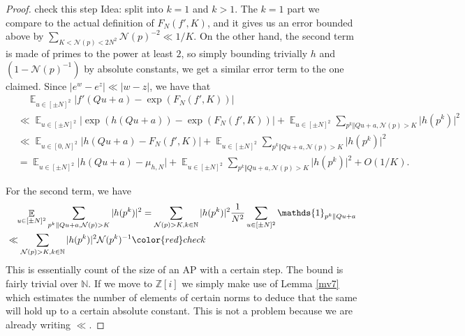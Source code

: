 \documentclass[11pt]{amsart}
\theoremstyle{definition}
\DeclareMathOperator*{\E}{\mathbb{E}}
\newcommand{\N}{{\mathbb N}}
\newcommand{\NN}{{\mathcal N}}
\newcommand{\Z}{{\mathbb Z}}
\begin{document}
\begin{proof}
 {\color{red} check this step}
 {\color{blue} Idea: split into $k=1$ and $k >1$. The $k=1$ part we compare to the actual definition of $F_N(f',K)$, and it gives us an error bounded above by $\sum_{K<\NN(p)<2N^2} \NN(p)^{-2}\ll 1/K$. On the other hand, the second term is made of primes to the power at least $2$, so simply bounding trivially $h$ and $(1-\NN(p)^{-1})$ by absolute constants, we get a similar error term to the one claimed.}
Since $\vert e^{w}-e^{z}\vert\ll \vert w-z\vert$, we have that
\begin{equation}
    \begin{split}
        &\quad\E_{u\in[\pm N]^{2}}\vert f'(Qu+a)-\exp(F_{N}(f',K))\vert
        \\&\ll \E_{u\in[\pm N]^{2}}\vert \exp(h(Qu+a))-\exp(F_{N}(f',K))\vert+\E_{u\in[\pm N]^{2}}\sum_{p^{k}\Vert Qu+a, \NN(p)>K}\vert h(p^{k})\vert^{2}
        \\&\ll \E_{u\in[0,N]^{2}}\vert h(Qu+a)-F_{N}(f',K)\vert+\E_{u\in[\pm N]^{2}}\sum_{p^{k}\Vert Qu+a, \NN(p)>K}\vert h(p^{k})\vert^{2}
        \\&=\E_{u\in[\pm N]^{2}}\vert h(Qu+a)-\mu_{h,N}\vert+\E_{u\in[\pm N]^{2}}\sum_{p^{k}\Vert Qu+a, \NN(p)>K}\vert h(p^{k})\vert^{2}+O(1/K).
    \end{split}
\end{equation}

For the second term, we have
\begin{equation}
    \begin{split}
        &\quad \E_{u\in[\pm N]^{2}}\sum_{p^{k}\Vert Qu+a, \NN(p)>K}\vert h(p^{k})\vert^{2}
        =\sum_{\NN(p)>K, k\in\N}\vert h(p^{k})\vert^{2}\frac{1}{N^{2}}\sum_{u\in [\pm N]^{2}}\mathds{1}_{p^{k}\Vert Qu+a}
        \\&\ll \sum_{\NN(p)>K, k\in\N}\vert h(p^{k})\vert^{2}\NN(p^{k})^{-1} {\color{red} check}
    \end{split}
\end{equation}
{\color{blue} This is essentially count of the size of an AP with a certain step. The bound is fairly trivial over $\N$. If we move to $\Z[i]$ we simply make use of Lemma \ref{mv7} which estimates the number of elements of certain norms to deduce that the same will hold up to a certain absolute constant. This is not a problem because we are already writing $\ll$.}


\end{proof}
\end{document}
